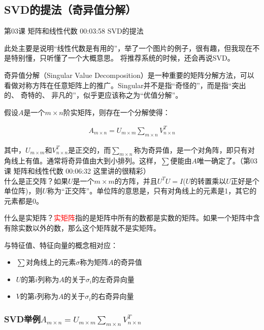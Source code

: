 \documentclass[UTF8]{ctexart}
\begin{document}
\subsection{SVD的提法（奇异值分解）}

第03课 矩阵和线性代数 00:03:58 SVD的提法

此处主要是说明“线性代数是有用的”，举了一个图片的例子，很有趣，但我现在不是特别懂，只听懂了一个大概意思。
将推荐系统的时候，还会再说SVD。

奇异值分解（Singular Value Decomposition）是一种重要的矩阵分解方法，可以看做对称方阵在任意矩阵上的推广。Singular并不是指“奇怪的”，而是指“突出的、 奇特的、 非凡的”，似乎更应该称之为“优值分解”。

假设$A$是一个$m \times n$阶实矩阵，则存在一个分解使得：

\begin{equation}
\begin{aligned}
A_{m \times n} = U_{m \times m} \sum _{m \times n} V_{n \times n}^{T}
\end{aligned}
\end{equation}

其中，$U_{m \times m}$和$V_{n \times n}^{T}$是正交的，而$\sum _{m \times n}$称为奇异值，是一个对角阵，即只有对角线上有值。通常将奇异值由大到小排列。这样，$\sum$便能由$A$唯一确定了。（第03课 矩阵和线性代数 00:06:32 这里讲的很精彩）\\

什么是正交阵？如果$U$是一个$m \times m$的方阵，并且$U^{T}U=I$($U$的转置乘以$U$正好是个单位阵)，则$U$称为“正交阵”。单位阵的意思是，只有对角线上的元素是1，其它的元素都是0。

什么是实矩阵？\textcolor{red}{实矩阵}指的是矩阵中所有的数都是实数的矩阵。如果一个矩阵中含有除实数以外的数，那么这个矩阵就不是实矩阵。

与特征值、特征向量的概念相对应：

\begin{itemize}
\item $\sum$对角线上的元素$\sigma$称为矩阵$A$的奇异值
\item $U$的第$i$列称为$A$的关于$\sigma_{i}$的左奇异向量
\item $V$的第$i$列称为$A$的关于$\sigma_{i}$的右奇异向量
\end{itemize}

\subsubsection{SVD举例$A_{m \times n} = U_{m \times m} \sum _{m \times n} V_{n \times n}^{T}$}
\end{document}
